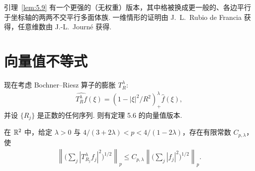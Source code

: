 \begin{remark}\label{rem:5.10}
引理~\ref{lem:5.9} 有一个更强的（无权重）版本，其中格被换成更一般的、各边平行于坐标轴的两两不交平行多面体族. 一维情形的证明由 J.~L.~Rubio de Francia \cite{b123} 获得，任意维数由 J.-L.~Journé \cite{b119} 获得.
\end{remark}

\section{向量值不等式}

现在考虑 Bochner--Riesz 算子的膨胀 $T_{R}^{\lambda}$:
\begin{align*}
  \widehat{T_{R}^{\lambda}f}(\xi)=(1-|\xi|^{2}/R^{2})_{+}^{\lambda}\widehat{f}(\xi),
\end{align*}
并设 $\{R_j\}$ 是正数的任何序列. 则有定理 5.6 的向量值版本.

\begin{theorem}\label{thm:5.11}
在 $\mathbb{R}^2$ 中，给定 $\lambda > 0$ 与 $4/(3+2\lambda) < p < 4/(1-2\lambda)$，存在有限常数 $C_{p,\lambda}$，使
\begin{align*}
  \left\|\Big(\sum_{j}|T_{R_{j}}^{\lambda}f_{j}|^{2}\Big)^{1/2}\right\|_{p}
  \leq C_{p,\lambda}\left\|\Big(\sum_{j}|f_{j}|^{2}\Big)^{1/2}\right\|_{p}.
\end{align*}
\end{theorem}

